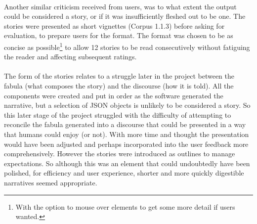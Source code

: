 \documentclass[letterpaper]{article}
\begin{document}
\\Another similar criticism received from users, was to what extent the output could be considered a story, or if it was insufficiently fleshed out to be one. The stories were presented as short vignettes (Corpus 1.1.3) before asking for evaluation, to prepare users for the format. The format was chosen to be as concise as possible\footnote{With the option to mouse over elements to get some more detail if users wanted.} to allow 12 stories to be read consecutively without fatiguing the reader and affecting subsequent ratings.\\
\\The form of the stories relates to a struggle later in the project between the fabula (what composes the story) and the discourse (how it is told). All the components were created and put in order as the software generated the narrative, but a selection of JSON objects is unlikely to be considered a story. So this later stage of the project struggled with the difficulty of attempting to reconcile the fabula generated into a discourse that could be presented in a way that humans could enjoy (or not). With more time and thought the presentation would have been adjusted and perhaps incorporated into the user feedback more comprehensively. However the stories were introduced as outlines to manage expectations. So although this was an element that could undoubtedly have been polished, for efficiency and user experience, shorter and more quickly digestible narratives seemed appropriate.
\end{document}
